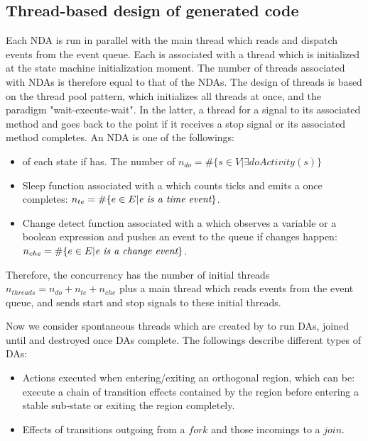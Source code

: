 \subsection{Thread-based design of generated code}
Each NDA is run in parallel with the main thread which reads and dispatch events from the event queue. 
Each is associated with a thread which is initialized at the state machine initialization moment. 
The number of threads associated with NDAs is therefore equal to that of the NDAs.
The design of threads is based on the thread pool pattern, which initializes all threads at once, and the paradigm "wait-execute-wait". 
In the latter, a thread  for a signal to  its associated method and goes back to the  point if it receives a stop signal or its associated method completes. 
An NDA is one of the followings:
\begin{itemize}
	\item {} of each state if has. The number of  $n_{do} = \#\{s \in V|\exists doActivity(s)\}$
	
	\item Sleep function associated with a  which counts ticks and emits a  once completes: $n_{te} = \#\{e \in E|\textit{e is a time event}\}$.
	
	\item Change detect function associated with a  which observes a variable or a boolean expression and pushes an event to the queue if changes happen: $n_{che} = \#\{e \in E|\textit{e is a change event}\}$.
\end{itemize} 

Therefore, the concurrency has the number of initial threads $n_{threads} = n_{do} + n_{te} + n_{che}$ plus a main thread which reads events from the event queue, and sends start and stop signals to these initial threads. 

Now we consider spontaneous threads which are created by  to run DAs, joined until and destroyed once DAs complete. The followings describe different types of DAs:

\begin{itemize}
	\item Actions executed when entering/exiting an orthogonal region, which can be: execute a chain of transition effects contained by the region before entering a stable sub-state or exiting the region completely.%
	
	\item Effects of transitions outgoing from a $fork$ and those incomings to a $join$.%
\end{itemize}

